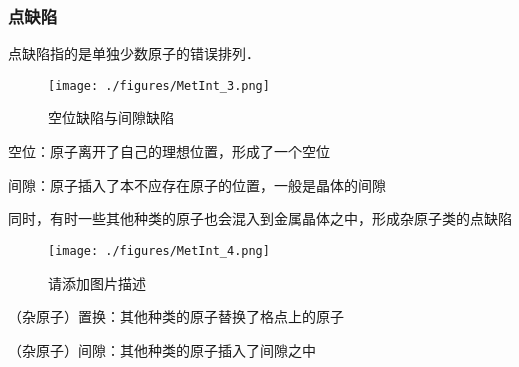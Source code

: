 \subsubsection{点缺陷}
点缺陷指的是单独少数原子的错误排列．
\begin{figure}[ht]
\centering
\texttt{[image: ./figures/MetInt\_3.png]}
\caption{空位缺陷与间隙缺陷} \label{MetInt_fig3}
\end{figure}
空位：原子离开了自己的理想位置，形成了一个空位

间隙：原子插入了本不应存在原子的位置，一般是晶体的间隙

同时，有时一些其他种类的原子也会混入到金属晶体之中，形成杂原子类的点缺陷
\begin{figure}[ht]
\centering
\texttt{[image: ./figures/MetInt\_4.png]}
\caption{请添加图片描述} \label{MetInt_fig4}
\end{figure}

（杂原子）置换：其他种类的原子替换了格点上的原子

（杂原子）间隙：其他种类的原子插入了间隙之中